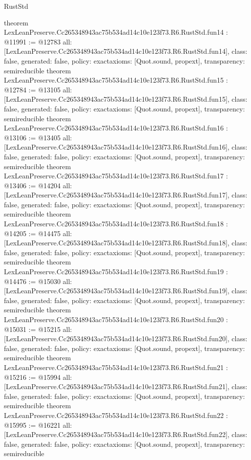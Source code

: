 \begin{lexlean}{RustStd}
\begin{coremodule}
{}
theorem LexLeanPreserve.Cc265348943ac75b534ad14c10e123f73.R6.RustStd.fun14 : @11991 := @12783 {
  all: [LexLeanPreserve.Cc265348943ac75b534ad14c10e123f73.R6.RustStd.fun14],
  class: false,
  generated: false,
  policy: exact{axioms: [Quot.sound, propext]},
  transparency: semireducible
}
theorem LexLeanPreserve.Cc265348943ac75b534ad14c10e123f73.R6.RustStd.fun15 : @12784 := @13105 {
  all: [LexLeanPreserve.Cc265348943ac75b534ad14c10e123f73.R6.RustStd.fun15],
  class: false,
  generated: false,
  policy: exact{axioms: [Quot.sound, propext]},
  transparency: semireducible
}
theorem LexLeanPreserve.Cc265348943ac75b534ad14c10e123f73.R6.RustStd.fun16 : @13106 := @13405 {
  all: [LexLeanPreserve.Cc265348943ac75b534ad14c10e123f73.R6.RustStd.fun16],
  class: false,
  generated: false,
  policy: exact{axioms: [Quot.sound, propext]},
  transparency: semireducible
}
theorem LexLeanPreserve.Cc265348943ac75b534ad14c10e123f73.R6.RustStd.fun17 : @13406 := @14204 {
  all: [LexLeanPreserve.Cc265348943ac75b534ad14c10e123f73.R6.RustStd.fun17],
  class: false,
  generated: false,
  policy: exact{axioms: [Quot.sound, propext]},
  transparency: semireducible
}
theorem LexLeanPreserve.Cc265348943ac75b534ad14c10e123f73.R6.RustStd.fun18 : @14205 := @14475 {
  all: [LexLeanPreserve.Cc265348943ac75b534ad14c10e123f73.R6.RustStd.fun18],
  class: false,
  generated: false,
  policy: exact{axioms: [Quot.sound, propext]},
  transparency: semireducible
}
theorem LexLeanPreserve.Cc265348943ac75b534ad14c10e123f73.R6.RustStd.fun19 : @14476 := @15030 {
  all: [LexLeanPreserve.Cc265348943ac75b534ad14c10e123f73.R6.RustStd.fun19],
  class: false,
  generated: false,
  policy: exact{axioms: [Quot.sound, propext]},
  transparency: semireducible
}
theorem LexLeanPreserve.Cc265348943ac75b534ad14c10e123f73.R6.RustStd.fun20 : @15031 := @15215 {
  all: [LexLeanPreserve.Cc265348943ac75b534ad14c10e123f73.R6.RustStd.fun20],
  class: false,
  generated: false,
  policy: exact{axioms: [Quot.sound, propext]},
  transparency: semireducible
}
theorem LexLeanPreserve.Cc265348943ac75b534ad14c10e123f73.R6.RustStd.fun21 : @15216 := @15994 {
  all: [LexLeanPreserve.Cc265348943ac75b534ad14c10e123f73.R6.RustStd.fun21],
  class: false,
  generated: false,
  policy: exact{axioms: [Quot.sound, propext]},
  transparency: semireducible
}
theorem LexLeanPreserve.Cc265348943ac75b534ad14c10e123f73.R6.RustStd.fun22 : @15995 := @16221 {
  all: [LexLeanPreserve.Cc265348943ac75b534ad14c10e123f73.R6.RustStd.fun22],
  class: false,
  generated: false,
  policy: exact{axioms: [Quot.sound, propext]},
  transparency: semireducible
}
\end{coremodule}
\end{lexlean}
